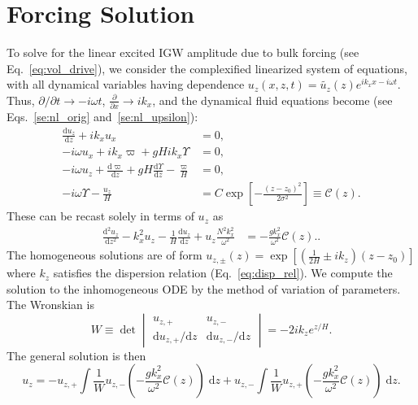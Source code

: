 \documentclass[
        fleqn,
        usenatbib,
        referee,
    ]{mnras}
\newcommand*{\rd}[2]{\frac{\mathrm{d}#1}{\mathrm{d}#2}}
\newcommand*{\rtd}[2]{\frac{\mathrm{d}^2#1}{\mathrm{d}#2^2}}
\newcommand*{\pd}[2]{\frac{\partial#1}{\partial#2}}
\newcommand*{\pdil}[2]{\partial#1/\partial#2}
\newcommand*{\rdil}[2]{\mathrm{d}#1/\mathrm{d}#2}
\newcommand*{\p}[1]{\left(#1\right)}
\newcommand*{\s}[1]{\left[#1\right]}
\begin{document}
\clearpage
\onecolumn
\appendix

\section{Forcing Solution}\label{s:force_solved}

To solve for the linear excited IGW amplitude due to bulk forcing
(see Eq.~\eqref{eq:vol_drive}), we consider the
complexified linearized system of equations, with all dynamical variables having
dependence $u_z(x, z, t) = \tilde{u_z}(z) e^{ik_xx - i\omega t}$. Thus,
$\pdil{}{t} \to -i\omega t$, $\pd{}{x} \to ik_x$, and the dynamical fluid
equations become (see Eqs.~\eqref{se:nl_orig} and~\eqref{se:nl_upsilon}):
\begin{align*}
    \rd{u_{z}}{z} + ik_xu_x &= 0,\\
    -i\omega u_x + ik_x \varpi + gHik_x \Upsilon &= 0,\\
    -i\omega u_{z} + \rd{\varpi}{z} + gH\rd{\Upsilon}{z}
        - \frac{\varpi}{H} &= 0,\\
    -i\omega \Upsilon - \frac{u_{z}}{H} &=
        C\exp\s{-\frac{(z - z_0)^2}{2\sigma^2}} \equiv \mathcal{C}(z).
\end{align*}
These can be recast solely in terms of $u_{z}$ as
\begin{align*}
     \rtd{u_{z}}{z} - k_x^2u_{z} - \frac{1}{H}\rd{u_{z}}{z}
        + u_{z}\frac{N^2k_x^2}{\omega^2} &=
    -\frac{gk_x^2}{\omega^2}\mathcal{C}(z).
        .\label{eq:narrow_inhomo}
\end{align*}
The homogeneous solutions are of form $u_{z,\pm}(z) = \exp\s{\p{\frac{1}{2H} \pm
ik_z}\p{z - z_0}}$ where $k_z$ satisfies the dispersion relation
(Eq.~\eqref{eq:disp_rel}). We compute the solution to the inhomogeneous ODE by
the method of variation of parameters. The Wronskian is
\begin{equation}
    W \equiv \det \begin{vmatrix}
        u_{z,+} & u_{z,-} \\[4pt]
        \rdil{u_{z,+}}{z} & \rdil{u_{z,-}}{z}
    \end{vmatrix} = -2ik_ze^{z/H}.
\end{equation}
The general solution is then
\begin{equation}
    u_z = -u_{z,+}\int \frac{1}{W} u_{z,-} \p{-\frac{gk_x^2}{\omega^2}
            \mathcal{C}(z)}\;\mathrm{d}z
        + u_{z,-}\int \frac{1}{W} u_{z,+} \p{-\frac{gk_x^2}{\omega^2}
            \mathcal{C}(z)}\;\mathrm{d}z.
\end{equation}
\end{document}
